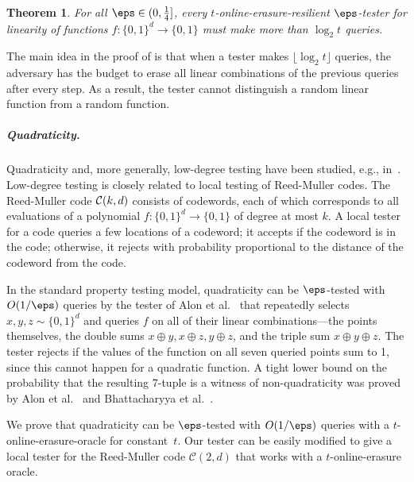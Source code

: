 \documentclass[11pt]{article}
\numberwithin{equation}{section}
\newtheorem{theorem}{Theorem}[section]
\theoremstyle{definition}
\theoremstyle{plain}
\begin{document}
\begin{theorem}\label{thm:linearity_lower}
For all $\eps \in(0, \frac{1}{4}]$, every $t$-online-erasure-resilient $\eps$-tester for linearity of functions $f \colon \{0,1\}^d\to \{0,1\}$ must make more than $\log_2 t$ queries. %
\end{theorem}


The main idea in the proof of  is that when a tester makes $\lfloor\log_2 t\rfloor$ queries, the adversary has the budget to erase all linear combinations of the previous queries after every step. As a result, the tester cannot distinguish a random linear function from a random function.


\subparagraph*{Quadraticity.}
Quadraticity and, more generally, low-degree testing have been studied, e.g.,
in~\cite{BabaiFL91,BabaiFLS91,GemmellLRSW91,FeigeGLSS96,FriedlS95,RubinfeldS96, RazS97, AlonKKLR05, AroraS03, MoshkovitzR08, Moshkovitz17, KaufmanR06, Samorodnitsky07, SamorodnitskyT09, JutlaPRZ09, BKSSZ10,HaramatySS13, Ron-ZewiS13, DinurG13}. 
%
%
Low-degree testing is closely related to local testing of Reed-Muller codes. The %
Reed-Muller code ${\cal C}(k,d)$ 
consists of codewords, each of which corresponds to all evaluations of a  polynomial $f\colon \{0,1\}^d \to \{0,1\}$  of degree at most $k$. %
A local tester for a code queries a few locations of a codeword; it accepts if the codeword is in the code; otherwise, it rejects with probability proportional to the distance of the codeword from the code.


In the standard property testing model, quadraticity can be $\eps$-tested with $O(1/\eps)$ queries by the tester of Alon et al.~\cite{AlonKKLR05} that repeatedly selects $x,y,z\sim\{0,1\}^d$ and queries $f$ on all of their linear combinations---the points themselves, the double sums $x\oplus y,x\oplus z, y\oplus z$, and the triple sum $x\oplus y\oplus z$. The tester rejects if the values of the function on all seven queried points sum to 1, since this cannot happen for a quadratic function.
 A tight lower bound on the probability that the resulting 7-tuple is a witness of non-quadraticity was proved by  Alon et al.~\cite{AlonKKLR05}
 and Bhattacharyya et al.~\cite{BKSSZ10}.


We prove that quadraticity can be $\eps$-tested with $O(1/\eps)$ queries with a $t$-online-erasure-oracle for constant~$t$. 
Our tester can be easily modified to give a local tester for the Reed-Muller code $\mathcal{C}(2,d)$ that works with a $t$-online-erasure oracle.
%
\end{document}
